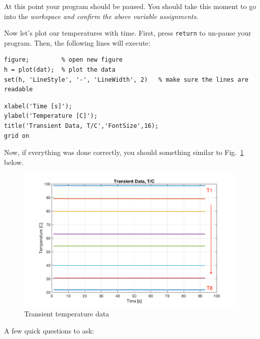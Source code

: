 \documentclass[11pt, letterpaper]{article}
\begin{document}
\n
At this point your program should be paused. You should take this moment to go into the \it{workspace} and confirm the above variable assignments.

\n
Now let's plot our temperatures with time.  First, press \texttt{return} to un-pause your program. Then, the following lines will execute:

\n
\begin{minipage}{\linewidth}
\begin{lstlisting}[numbers=none]
figure;         % open new figure
h = plot(dat);  % plot the data
set(h, 'LineStyle', '-', 'LineWidth', 2)   % make sure the lines are readable
\end{lstlisting}
\end{minipage}

\n
\begin{minipage}{\linewidth}
\begin{lstlisting}[numbers=none]
% don't forget to add labels!!
xlabel('Time [s]');
ylabel('Temperature [C]');
title('Transient Data, T/C','FontSize',16);
grid on
\end{lstlisting}
\end{minipage}

\n
Now, if everything was done correctly, you should something similar to Fig.~\ref{fig1} below.


\begin{figure}[H]
    \begin{center}
        \includegraphics[width=125mm]{gfx/fig1.png}
    \caption{Transient temperature data}\label{fig1}
    \end{center}
\end{figure}

A few quick questions to ask:
\end{document}
